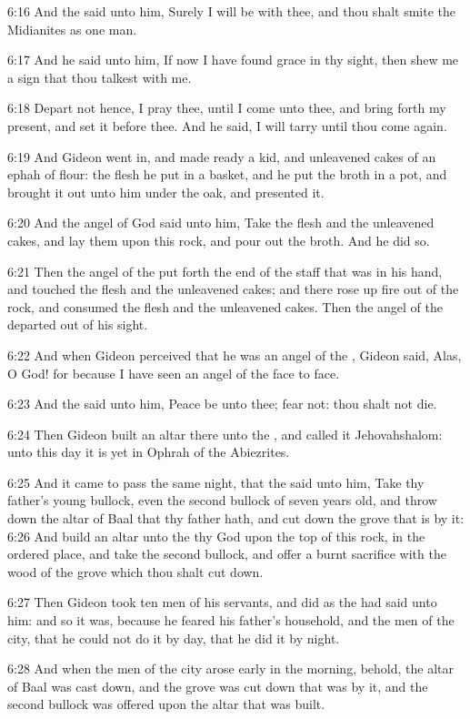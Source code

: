 6:16 And the \LORD said unto him, Surely I will be with thee, and thou shalt smite the Midianites as one man.

6:17 And he said unto him, If now I have found grace in thy sight, then shew me a sign that thou talkest with me.

6:18 Depart not hence, I pray thee, until I come unto thee, and bring forth my present, and set it before thee. And he said, I will tarry until thou come again.

6:19 And Gideon went in, and made ready a kid, and unleavened cakes of an ephah of flour: the flesh he put in a basket, and he put the broth in a pot, and brought it out unto him under the oak, and presented it.

6:20 And the angel of God said unto him, Take the flesh and the unleavened cakes, and lay them upon this rock, and pour out the broth.  And he did so.

6:21 Then the angel of the \LORD put forth the end of the staff that was in his hand, and touched the flesh and the unleavened cakes; and there rose up fire out of the rock, and consumed the flesh and the unleavened cakes. Then the angel of the \LORD departed out of his sight.

6:22 And when Gideon perceived that he was an angel of the \LORD, Gideon said, Alas, O \LORD God! for because I have seen an angel of the \LORD face to face.

6:23 And the \LORD said unto him, Peace be unto thee; fear not: thou shalt not die.

6:24 Then Gideon built an altar there unto the \LORD, and called it Jehovahshalom: unto this day it is yet in Ophrah of the Abiezrites.

6:25 And it came to pass the same night, that the \LORD said unto him, Take thy father's young bullock, even the second bullock of seven years old, and throw down the altar of Baal that thy father hath, and cut down the grove that is by it: 6:26 And build an altar unto the \LORD thy God upon the top of this rock, in the ordered place, and take the second bullock, and offer a burnt sacrifice with the wood of the grove which thou shalt cut down.

6:27 Then Gideon took ten men of his servants, and did as the \LORD had said unto him: and so it was, because he feared his father's household, and the men of the city, that he could not do it by day, that he did it by night.

6:28 And when the men of the city arose early in the morning, behold, the altar of Baal was cast down, and the grove was cut down that was by it, and the second bullock was offered upon the altar that was built.

